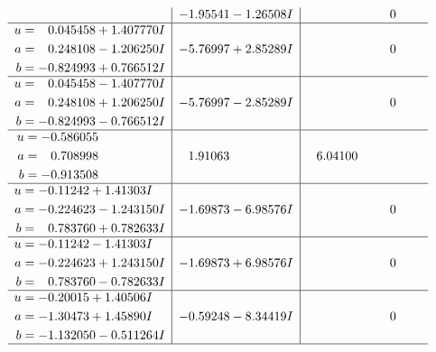 \documentclass[1p]{elsarticle_modified}
\theoremstyle{definition}
\begin{document}
$$\begin{array}{c|c|c}
 & -1.95541 - 1.26508 I & \phantom{-0.000000 } 0 \\ \hline\begin{aligned}
u &= \phantom{-}0.045458 + 1.407770 I \\
a &= \phantom{-}0.248108 - 1.206250 I \\
b &= -0.824993 + 0.766512 I\end{aligned}
 & -5.76997 + 2.85289 I & \phantom{-0.000000 } 0 \\ \hline\begin{aligned}
u &= \phantom{-}0.045458 - 1.407770 I \\
a &= \phantom{-}0.248108 + 1.206250 I \\
b &= -0.824993 - 0.766512 I\end{aligned}
 & -5.76997 - 2.85289 I & \phantom{-0.000000 } 0 \\ \hline\begin{aligned}
u &= -0.586055\phantom{ +0.000000I} \\
a &= \phantom{-}0.708998\phantom{ +0.000000I} \\
b &= -0.913508\phantom{ +0.000000I}\end{aligned}
 & \phantom{-}1.91063\phantom{ +0.000000I} & \phantom{-}6.04100\phantom{ +0.000000I} \\ \hline\begin{aligned}
u &= -0.11242 + 1.41303 I \\
a &= -0.224623 - 1.243150 I \\
b &= \phantom{-}0.783760 + 0.782633 I\end{aligned}
 & -1.69873 - 6.98576 I & \phantom{-0.000000 } 0 \\ \hline\begin{aligned}
u &= -0.11242 - 1.41303 I \\
a &= -0.224623 + 1.243150 I \\
b &= \phantom{-}0.783760 - 0.782633 I\end{aligned}
 & -1.69873 + 6.98576 I & \phantom{-0.000000 } 0 \\ \hline\begin{aligned}
u &= -0.20015 + 1.40506 I \\
a &= -1.30473 + 1.45890 I \\
b &= -1.132050 - 0.511264 I\end{aligned}
 & -0.59248 - 8.34419 I & \phantom{-0.000000 } 0\\
 \hline 
 \end{array}$$\newpage$$\begin{array}{c|c|c}  

\end{array}$$
\end{document}
